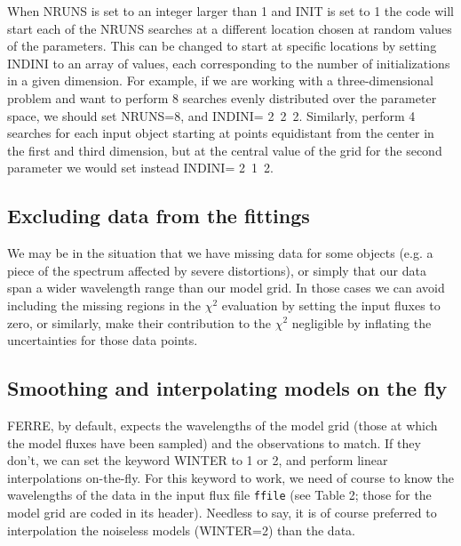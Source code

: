 \documentclass[12pt]{article}
\begin{document}
When NRUNS is set to an integer larger than
1 and INIT is set to 1 the code will start each of the NRUNS searches at a 
different location chosen at random values of the parameters. This can be changed 
to start at specific locations by setting INDINI to an array of values, each
corresponding to the number of initializations in a given dimension. For example,
if we are working with a three-dimensional problem and want to perform 8 searches
evenly distributed over the parameter space, we should set NRUNS=8, and
INDINI= 2~2~2.  Similarly, perform 4 searches for each input object 
starting at points equidistant from the center in the first and third dimension,
but at the central value of the grid for the second parameter we would set instead
INDINI= 2~1~2.

\subsection{Excluding data from the fittings}

We may be in the situation that we have missing data for some objects
(e.g. a piece of the spectrum affected by severe distortions), or
simply that our data span a wider wavelength range than our model grid.
In those cases  we can avoid including the missing regions in the 
$\chi^2$ evaluation by setting the input fluxes to zero, or similarly, 
make their contribution to the $\chi^2$ negligible by inflating the uncertainties
for those data points.

\subsection{Smoothing and interpolating models on the fly}
\label{sinter}

FERRE, by default, expects the wavelengths of the model grid (those at which
the model fluxes have been sampled) and the observations to match. If they don't,
we can set the keyword WINTER to 1 or 2, and perform linear interpolations
on-the-fly. For this keyword to work, we need of course to know the wavelengths
of the data in the input flux file {\tt ffile} (see Table 2; those for the model
grid are coded in its header).
Needless to say, it is of course preferred to interpolation the noiseless 
models (WINTER=2) than the data.
\end{document}
